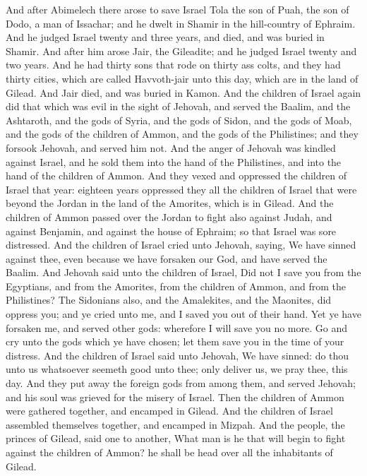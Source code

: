 And after Abimelech there arose to save Israel Tola the son of Puah, the son of Dodo, a man of Issachar; and he dwelt in Shamir in the hill-country of Ephraim. And he judged Israel twenty and three years, and died, and was buried in Shamir.  And after him arose Jair, the Gileadite; and he judged Israel twenty and two years. And he had thirty sons that rode on thirty ass colts, and they had thirty cities, which are called Havvoth-jair unto this day, which are in the land of Gilead. And Jair died, and was buried in Kamon.  And the children of Israel again did that which was evil in the sight of Jehovah, and served the Baalim, and the Ashtaroth, and the gods of Syria, and the gods of Sidon, and the gods of Moab, and the gods of the children of Ammon, and the gods of the Philistines; and they forsook Jehovah, and served him not. And the anger of Jehovah was kindled against Israel, and he sold them into the hand of the Philistines, and into the hand of the children of Ammon. And they vexed and oppressed the children of Israel that year: eighteen years oppressed they all the children of Israel that were beyond the Jordan in the land of the Amorites, which is in Gilead. And the children of Ammon passed over the Jordan to fight also against Judah, and against Benjamin, and against the house of Ephraim; so that Israel was sore distressed.  And the children of Israel cried unto Jehovah, saying, We have sinned against thee, even because we have forsaken our God, and have served the Baalim. And Jehovah said unto the children of Israel, Did not I save you from the Egyptians, and from the Amorites, from the children of Ammon, and from the Philistines? The Sidonians also, and the Amalekites, and the Maonites, did oppress you; and ye cried unto me, and I saved you out of their hand. Yet ye have forsaken me, and served other gods: wherefore I will save you no more. Go and cry unto the gods which ye have chosen; let them save you in the time of your distress. And the children of Israel said unto Jehovah, We have sinned: do thou unto us whatsoever seemeth good unto thee; only deliver us, we pray thee, this day. And they put away the foreign gods from among them, and served Jehovah; and his soul was grieved for the misery of Israel.  Then the children of Ammon were gathered together, and encamped in Gilead. And the children of Israel assembled themselves together, and encamped in Mizpah. And the people, the princes of Gilead, said one to another, What man is he that will begin to fight against the children of Ammon? he shall be head over all the inhabitants of Gilead. 

